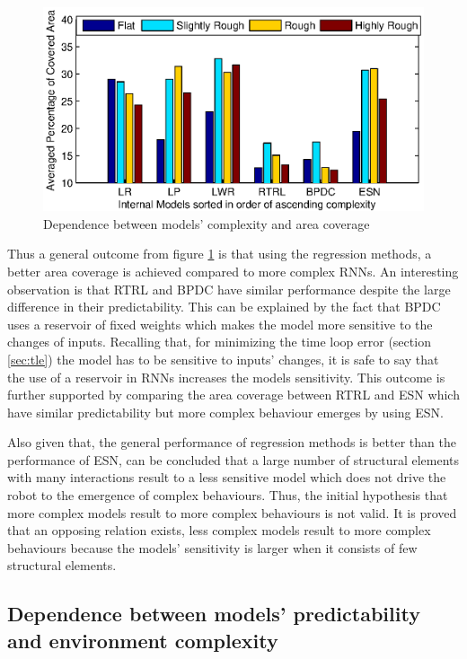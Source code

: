 \documentclass[msc,ai,logo]{infthesis}
\begin{document}
\begin{figure}[H]
\includegraphics[scale=0.94]{Area_Complex.eps}
\centering
\caption{Dependence between models' complexity and area coverage}
\label{fig:Area_Compl}
\end{figure}

Thus a general outcome from figure \ref{fig:Area_Compl} is that using the regression methods, a better area coverage is achieved compared to more complex RNNs. An interesting observation is that RTRL and BPDC have similar performance despite the large difference in their predictability. This can be explained by the fact that BPDC uses a reservoir of fixed weights which makes the model more sensitive to the changes of inputs. Recalling that, for minimizing the time loop error (section \ref{sec:tle}) the model has to be sensitive to inputs' changes, it is safe to say that the use of a reservoir in RNNs increases the models sensitivity. This outcome is further supported by comparing the area coverage between RTRL and ESN which have similar predictability but more complex behaviour emerges by using ESN.  

Also given that, the general performance of regression methods is better than the performance of ESN, can be concluded that a large number of structural elements with many interactions result to a less sensitive model which does not drive the robot to the emergence of complex behaviours. Thus, the initial hypothesis that more complex models result to more complex behaviours is not valid. It is proved that an opposing relation exists, less complex models result to more complex behaviours because the models' sensitivity is larger when it consists of few structural elements. 

\subsection*{Dependence between models' predictability and environment complexity}
\end{document}
